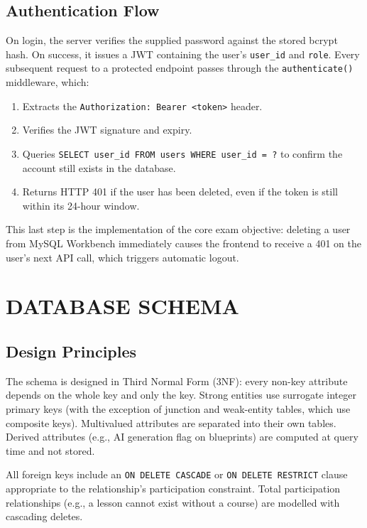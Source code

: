 \documentclass[12pt,a4paper]{article}
\begin{document}
\subsection{Authentication Flow}

On login, the server verifies the supplied password against the stored bcrypt hash. On success,
it issues a JWT containing the user's \texttt{user\_id} and \texttt{role}. Every subsequent
request to a protected endpoint passes through the \texttt{authenticate()} middleware, which:

\begin{enumerate}[label=\arabic*., itemsep=2pt]
    \item Extracts the \texttt{Authorization: Bearer <token>} header.
    \item Verifies the JWT signature and expiry.
    \item Queries \texttt{SELECT user\_id FROM users WHERE user\_id = ?} to confirm the account
          still exists in the database.
    \item Returns HTTP 401 if the user has been deleted, even if the token is still within its
          24-hour window.
\end{enumerate}

This last step is the implementation of the core exam objective: deleting a user from MySQL
Workbench immediately causes the frontend to receive a 401 on the user's next API call, which
triggers automatic logout.

\section{DATABASE SCHEMA}

\subsection{Design Principles}

The schema is designed in Third Normal Form (3NF): every non-key attribute depends on the whole
key and only the key. Strong entities use surrogate integer primary keys (with the exception of
junction and weak-entity tables, which use composite keys). Multivalued attributes are separated
into their own tables. Derived attributes (e.g., AI generation flag on blueprints) are computed
at query time and not stored.

All foreign keys include an \texttt{ON DELETE CASCADE} or \texttt{ON DELETE RESTRICT} clause
appropriate to the relationship's participation constraint. Total participation relationships
(e.g., a lesson cannot exist without a course) are modelled with cascading deletes.
\end{document}
